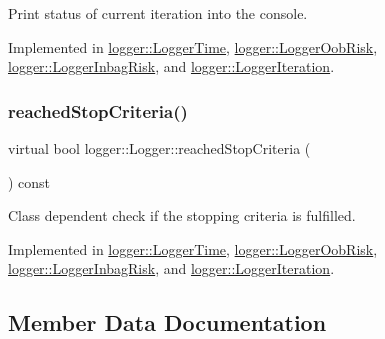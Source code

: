Print status of current iteration into the console. 



Implemented in \mbox{\hyperlink{classlogger_1_1_logger_time_a22bef2a992b88689d7748c4017e17d19}{logger\+::\+Logger\+Time}}, \mbox{\hyperlink{classlogger_1_1_logger_oob_risk_a446e3e0c3766c8cda1add83c09d2e968}{logger\+::\+Logger\+Oob\+Risk}}, \mbox{\hyperlink{classlogger_1_1_logger_inbag_risk_a3b7e827e941f2cb4b9def7296a5db38f}{logger\+::\+Logger\+Inbag\+Risk}}, and \mbox{\hyperlink{classlogger_1_1_logger_iteration_ac6283092f495a6e8c5ab357ae84cb911}{logger\+::\+Logger\+Iteration}}.

\mbox{\label{classlogger_1_1_logger_aed91421c07062b91cee158ef2bda7ae8}} 
\subsubsection{\texorpdfstring{reached\+Stop\+Criteria()}{reachedStopCriteria()}}
{\footnotesize\ttfamily virtual bool logger\+::\+Logger\+::reached\+Stop\+Criteria (\begin{DoxyParamCaption}{ }\end{DoxyParamCaption}) const\hspace{0.3cm}{\ttfamily [pure virtual]}}



Class dependent check if the stopping criteria is fulfilled. 



Implemented in \mbox{\hyperlink{classlogger_1_1_logger_time_a727f16a2deed4d64293844615f18df08}{logger\+::\+Logger\+Time}}, \mbox{\hyperlink{classlogger_1_1_logger_oob_risk_a15c6792b0e1d2acbdd907f697f2884f3}{logger\+::\+Logger\+Oob\+Risk}}, \mbox{\hyperlink{classlogger_1_1_logger_inbag_risk_a48453cfb5a3bbe3b1a73bbcb2d40f49e}{logger\+::\+Logger\+Inbag\+Risk}}, and \mbox{\hyperlink{classlogger_1_1_logger_iteration_af4cd1f0b87dcff8a88439f2ca6b07f1f}{logger\+::\+Logger\+Iteration}}.



\subsection{Member Data Documentation}
\mbox{\label{classlogger_1_1_logger_a57ca2ab531e0a7ac74f4ecd4b74a938f}} 

